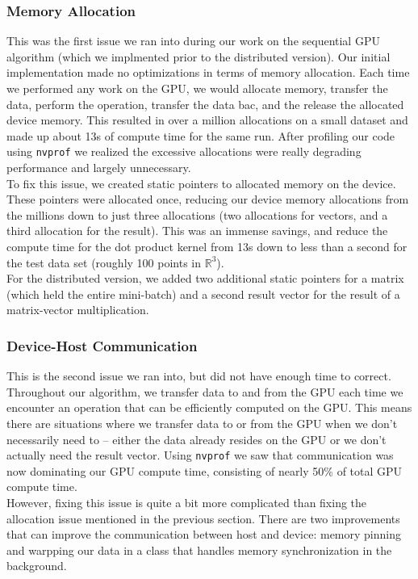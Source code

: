 \documentclass{article}
\def \R {\mathbb{R}}
\def \R {\mathbb{R}}
\begin{document}
\subsubsection{Memory Allocation}
This was the first issue we ran into during our work on the sequential GPU
algorithm (which we implmented prior to the distributed version). Our initial
implementation made no optimizations in terms of memory allocation. Each time
we performed any work on the GPU, we would allocate memory, transfer the data,
perform the operation, transfer the data bac, and the release the allocated
device memory. This resulted in over a million allocations on a small dataset
and made up about 13s of compute time for the same run. After profiling our
code using \texttt{nvprof} we realized the excessive allocations were really
degrading performance and largely unnecessary.\\

To fix this issue, we created static
pointers to allocated memory on the device. These pointers were allocated once,
reducing our device memory allocations from the millions down to just three
allocations (two allocations for vectors, and a third allocation for the
result). This was an immense savings, and reduce the compute time for the dot
product kernel from 13s down to less than a second for the test data set
(roughly 100 points in $\R^3$).\\

For the distributed version, we added two additional static pointers for a
matrix (which held the entire mini-batch) and a second result vector for the
result of a matrix-vector multiplication. 

\subsubsection{Device-Host Communication}
This is the second issue we ran into, but did not have enough time to correct.
Throughout our algorithm, we transfer data to and from the GPU each time we
encounter an operation that can be efficiently computed on the GPU. This means
there are situations where we transfer data to or from the GPU when we don't
necessarily need to -- either the data already resides on the GPU or we don't
actually need the result vector. Using \texttt{nvprof} we saw that
communication was now dominating our GPU compute time, consisting of nearly
50\% of total GPU compute time.\\

However, fixing this issue is quite a bit more complicated than fixing the
allocation issue mentioned in the previous section. There are two improvements
that can improve the communication between host and device: memory pinning and
warpping our data in a class that handles memory synchronization in the
background.
\end{document}
